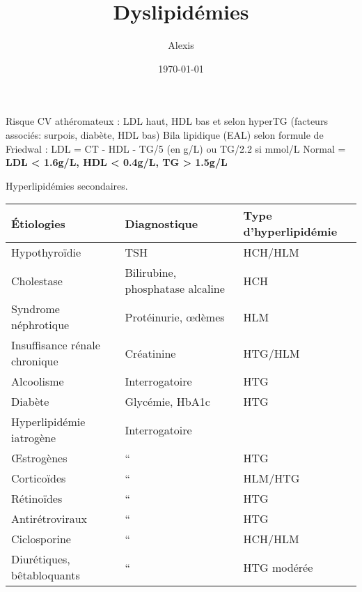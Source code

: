 \documentclass[11pt]{article}
\author{Alexis}
\date{\today}
\title{Dyslipidémies}
\begin{document}
\maketitle
\tableofcontents

Risque CV athéromateux : LDL haut, HDL bas et selon hyperTG (facteurs associés: surpois, diabète, HDL bas)
Bila lipidique (EAL) selon formule de Friedwal : LDL = CT - HDL - TG/5 (en g/L) ou TG/2.2 si mmol/L
Normal = \textbf{LDL < 1.6g/L, HDL < 0.4g/L, TG > 1.5g/L}

Hyperlipidémies secondaires.
\begin{center}
\begin{tabular}{lll}
Étiologies & Diagnostique & Type d'hyperlipidémie\\
\hline
Hypothyroïdie & TSH & HCH/HLM\\
Cholestase & Bilirubine, phosphatase alcaline & HCH\\
Syndrome néphrotique & Protéinurie, œdèmes & HLM\\
Insuffisance rénale chronique & Créatinine & HTG/HLM\\
Alcoolisme & Interrogatoire & HTG\\
Diabète & Glycémie, HbA1c & HTG\\
Hyperlipidémie iatrogène & Interrogatoire & \\
Œstrogènes & `` & HTG\\
Corticoïdes & `` & HLM/HTG\\
Rétinoïdes & `` & HTG\\
Antirétroviraux & `` & HTG\\
Ciclosporine & `` & HCH/HLM\\
Diurétiques, bêtabloquants & `` & HTG modérée\\
\end{tabular}
\end{center}
\end{document}
